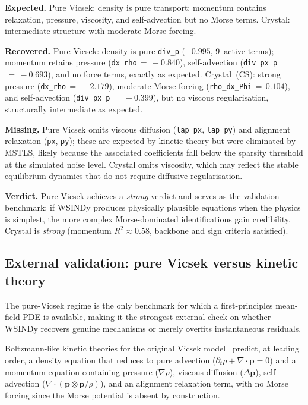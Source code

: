 \noindent\textbf{Expected.}
Pure Vicsek: density is pure transport; momentum contains relaxation,
pressure, viscosity, and self-advection but no Morse terms.
Crystal: intermediate structure with moderate Morse forcing.

\noindent\textbf{Recovered.}
Pure Vicsek: density is pure \texttt{div\_p} ($-0.995$, 9~active terms);
momentum retains pressure (\texttt{dx\_rho}${}\,=\,-0.840$),
self-advection (\texttt{div\_px\_p}${}\,=\,-0.693$), and no force
terms, exactly as expected.
Crystal~(CS): strong pressure (\texttt{dx\_rho}${}\,=\,-2.179$), moderate
Morse forcing (\texttt{rho\_dx\_Phi}${}\,=\,0.104$), and self-advection
(\texttt{div\_px\_p}${}\,=\,-0.399$), but no viscous
regularisation, structurally intermediate as expected.

\noindent\textbf{Missing.}
Pure Vicsek omits viscous diffusion (\texttt{lap\_px}, \texttt{lap\_py})
and alignment relaxation (\texttt{px}, \texttt{py}); these are expected
by kinetic theory but were eliminated by MSTLS, likely because the
associated coefficients fall below the sparsity threshold at the
simulated noise level.
Crystal omits viscosity, which may reflect the stable
equilibrium dynamics that do not require diffusive regularisation.

\noindent\textbf{Verdict.}
Pure Vicsek achieves a \emph{strong} verdict and serves as the validation
benchmark: if WSINDy produces physically plausible equations when the
physics is simplest, the more complex Morse-dominated identifications gain
credibility.  Crystal is \emph{strong} (momentum $R^2\approx 0.58$,
backbone and sign criteria satisfied).

\subsection{External validation: pure Vicsek versus kinetic theory}
\label{subsec:pv_kinetic_validation}

The pure-Vicsek regime is the only benchmark for which a first-principles
mean-field PDE is available, making it the strongest external check on
whether WSINDy recovers genuine mechanisms or merely overfits
instantaneous residuals.

Boltzmann-like kinetic theories for the original Vicsek
model~\cite{toner2005hydrodynamics,bertin2006boltzmann,degond2008continuum,ihle2011kinetic}
predict, at leading order, a density equation that reduces to pure
advection ($\partial_t\rho + \nabla\!\cdot\!\mathbf{p} = 0$) and a
momentum equation containing pressure ($\nabla\rho$), viscous diffusion
($\Delta\mathbf{p}$), self-advection ($\nabla\!\cdot\!(\mathbf{p}\otimes
\mathbf{p}/\rho)$), and an alignment relaxation term, with no Morse
forcing since the Morse potential is absent by construction.

